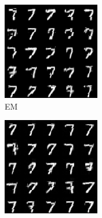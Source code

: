 \begin{figure}[htb]
    \centering
    \begin{subfigure}[b]{0.3\textwidth}
        \centering
        \includegraphics[width=\textwidth]{figures/mnist_EM.png} %
        \caption{EM}
        \label{fig:sub1}
    \end{subfigure}
    \hfill
    \begin{subfigure}[b]{0.3\textwidth}
        \centering
        \includegraphics[width=\textwidth]{figures/mnist_SGD.png} %

\end{subfigure}
\end{figure}

